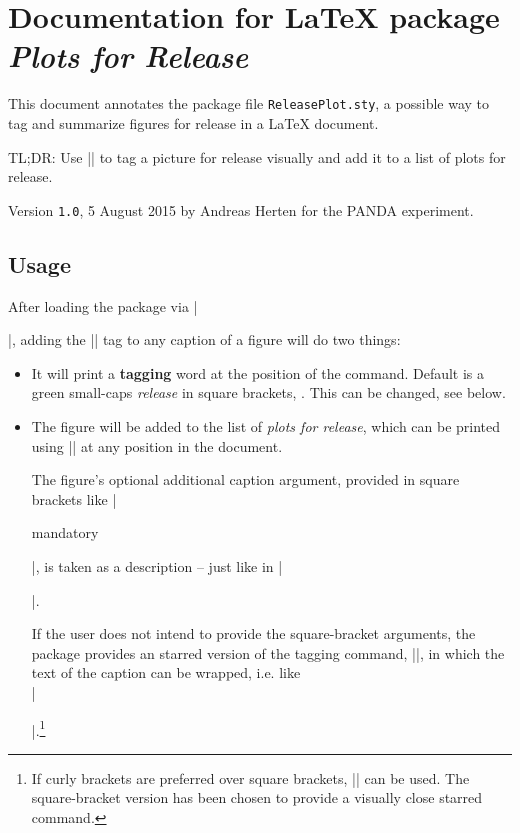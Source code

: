 \documentclass[article,oneside]{memoir}  %
\newcommand{\version}{1.0}
\newcommand{\currentdate}{5 August 2015}
\renewcommand{\author}{Andreas Herten}
\begin{document}
\chapter*{Documentation for \LaTeX{} package \emph{Plots for Release}}
This document annotates the package file \texttt{ReleasePlot.sty}, a possible way to tag and summarize figures for release in a \LaTeX{} document.
\vspace{2ex}

\noindent TL;DR: Use \codeLATEX|\plotRelease| to tag a picture for release visually and add it to a list of plots for release.

\vspace{2ex}

\noindent Version \texttt{\version}, \currentdate{} by \author{} for the PANDA experiment.

\tableofcontents

\section{Usage} %
\label{sec:usage}
After loading the package via \codeLATEX|\usepackage{ReleasePlot}|, adding the \codeLATEX|\plotRelease| tag to any caption of a figure will do two things:
\begin{itemize}
	\item It will print a \textbf{tagging} word at the position of the command. Default is a green small-caps \emph{release} in square brackets, \RPText. This can be changed, see below.
	\item The figure will be added to the list of \emph{plots for release}, which can be printed using \codeLATEX|\listofreleaseplots| at any position in the document.

	The figure's optional additional caption argument, provided in square brackets like \codeLATEX|\caption[optional]{mandatory}|, is taken as a description -- just like in \codeLATEX|\listoffigures|.

	If the user does not intend to provide the square-bracket arguments, the package provides an starred version of the tagging command, \codeLATEX|\plotRelease*[]|, in which the text of the caption can be wrapped, i.e. like\\
	\codeLATEX|\caption{}|.\footnote{If curly brackets are preferred over square brackets, \codeLATEX|\plotReleaseCurly{}| can be used. The square-bracket version has been chosen to provide a visually close starred command.}
\end{itemize}
\clearpage
\end{document}
